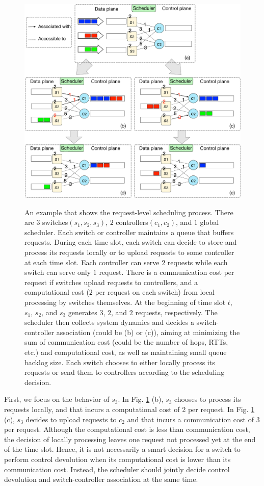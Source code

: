 \documentclass[10pt,journal,compsoc]{IEEEtran}
\begin{document}
\begin{figure}[!t]
\centering
 {
 \includegraphics[width=1.0\columnwidth]{demo.eps}
 }
 \caption{An example that shows the request-level scheduling process. 
There are $3$ switches$(s_1,s_2,s_3)$, $2$ controllers$(c_1,c_2)$, and $1$ global scheduler. 
Each switch or controller maintains a queue that buffers requests. 
During each time slot, each switch can decide to store and process its requests locally or to upload requests to some controller at each time slot. Each controller can serve $2$ requests while each switch can serve only $1$ request. There is a communication cost per request if switches upload requests to controllers, and a computational cost ($2$ per request on each switch) from local processing by switches themselves. At the beginning of time slot $t$, $s_1$, $s_2$, and $s_3$ generates $3$, $2$, and $2$ requests, respectively. The scheduler then collects system dynamics and decides a switch-controller association (could be (b) or (c)), aiming at minimizing the sum of communication cost (could be the number of hops, RTTs, etc.) and computational cost, as well as maintaining small queue backlog size. Each switch chooses to either locally process its requests or send them to controllers according to the scheduling decision.}
 \label{fig_sim}
\end{figure}

First, we focus on the behavior of $s_3$. In Fig. \ref{fig_sim} (b), $s_3$ chooses to process its requests locally,  and that incurs a computational cost of 2 per request. In Fig. \ref{fig_sim} (c), $s_3$ decides to upload requests to $c_2$ and that incurs a communication cost of 3 per request. Although the computational cost is less than communication cost, the decision of locally processing leaves one request not processed yet at the end of the time slot. Hence, it is not necessarily a smart decision for a switch to perform control devolution when its computational cost is lower than its communication cost. Instead, the scheduler should jointly decide control devolution and switch-controller association at the same time.
\end{document}
